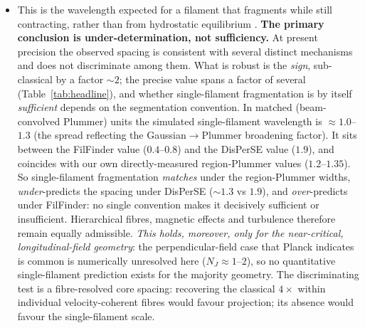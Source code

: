\documentclass[usenatbib,twoside,twocolumn]{mnras}
\begin{document}
\begin{itemize}
\begin{itemize}
        \item This is the wavelength expected for a filament that fragments while still contracting, rather than from hydrostatic equilibrium \citep{Clarke2016}. \textbf{The primary conclusion is under-determination, not sufficiency.} At present precision the observed spacing is consistent with several distinct mechanisms and does not discriminate among them. What is robust is the \emph{sign}, sub-classical by a factor $\sim2$; the precise value spans a factor of several (Table~\ref{tab:headline}), and whether single-filament fragmentation is by itself \emph{sufficient} depends on the segmentation convention. In matched (beam-convolved Plummer) units the simulated single-filament wavelength is $\approx1.0$--$1.3$ (the spread reflecting the Gaussian$\to$Plummer broadening factor). It sits between the FilFinder value ($0.4$--$0.8$) and the DisPerSE value ($1.9$), and coincides with our own directly-measured region-Plummer values ($1.2$--$1.35$). So single-filament fragmentation \emph{matches} under the region-Plummer widths, \emph{under}-predicts the spacing under DisPerSE ($\sim1.3$ vs $1.9$), and \emph{over}-predicts under FilFinder: no single convention makes it decisively sufficient or insufficient. Hierarchical fibres, magnetic effects and turbulence therefore remain equally admissible. \emph{This holds, moreover, only for the near-critical, longitudinal-field geometry}: the perpendicular-field case that Planck indicates is common is numerically unresolved here ($N_J\approx1$--$2$), so no quantitative single-filament prediction exists for the majority geometry. The discriminating test is a fibre-resolved core spacing: recovering the classical $4\times$ within individual velocity-coherent fibres would favour projection; its absence would favour the single-filament scale.
    \end{itemize}


\end{itemize}
\end{document}
